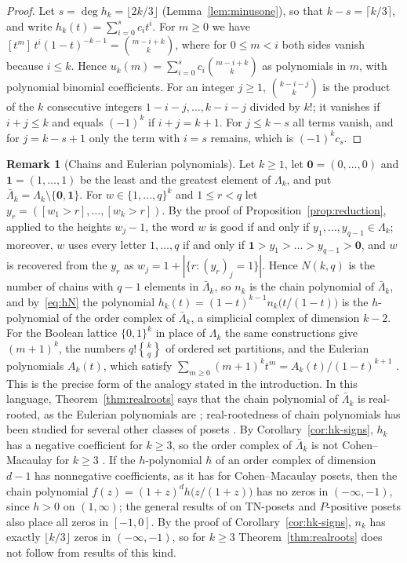 \documentclass[11pt]{amsart}
\theoremstyle{definition}
\newtheorem{remark}[theorem]{Remark}
\newcommand{\stirling}[2]{\genfrac{\{}{\}}{0pt}{}{#1}{#2}}
\begin{document}
\begin{proof}
Let $s=\deg h_k=\lfloor2k/3\rfloor$ (Lemma~\ref{lem:minusone}), so that $k-s=\lceil k/3\rceil$, and write $h_k(t)=\sum_{i=0}^{s}c_it^i$. For $m\ge0$ we have $[t^m]\,t^i(1-t)^{-k-1}=\binom{m-i+k}{k}$, where for $0\le m<i$ both sides vanish because $i\le k$. Hence $u_k(m)=\sum_{i=0}^{s}c_i\binom{m-i+k}{k}$ as polynomials in $m$, with polynomial binomial coefficients. For an integer $j\ge1$, $\binom{k-i-j}{k}$ is the product of the $k$ consecutive integers $1-i-j,\dots,k-i-j$ divided by $k!$; it vanishes if $i+j\le k$ and equals $(-1)^k$ if $i+j=k+1$. For $j\le k-s$ all terms vanish, and for $j=k-s+1$ only the term with $i=s$ remains, which is $(-1)^kc_s$.
\end{proof}

\begin{remark}[Chains and Eulerian polynomials]\label{rem:chains}
Let $k\ge1$, let $\mathbf 0=(0,\dots,0)$ and $\mathbf 1=(1,\dots,1)$ be the least and the greatest element of $\Lambda_k$, and put $\bar\Lambda_k=\Lambda_k\setminus\{\mathbf 0,\mathbf 1\}$. For $w\in\{1,\dots,q\}^k$ and $1\le r<q$ let $y_r=([w_1>r],\dots,[w_k>r])$. By the proof of Proposition~\ref{prop:reduction}, applied to the heights $w_j-1$, the word $w$ is good if and only if $y_1,\dots,y_{q-1}\in\Lambda_k$; moreover, $w$ uses every letter $1,\dots,q$ if and only if $\mathbf 1>y_1>\dots>y_{q-1}>\mathbf 0$, and $w$ is recovered from the $y_r$ as $w_j=1+|\{r:(y_r)_j=1\}|$. Hence $N(k,q)$ is the number of chains with $q-1$ elements in $\bar\Lambda_k$, so $n_k$ is the chain polynomial of $\bar\Lambda_k$, and by~\eqref{eq:hN} the polynomial $h_k(t)=(1-t)^{k-1}n_k\bigl(t/(1-t)\bigr)$ is the $h$-polynomial of the order complex of $\bar\Lambda_k$, a simplicial complex of dimension $k-2$. For the Boolean lattice $\{0,1\}^k$ in place of $\Lambda_k$ the same constructions give $(m+1)^k$, the numbers $q!\stirling{k}{q}$ of ordered set partitions, and the Eulerian polynomials $A_k(t)$, which satisfy $\sum_{m\ge0}(m+1)^kt^m=A_k(t)/(1-t)^{k+1}$ \cite[Section~1.4]{StanleyEC1}. This is the precise form of the analogy stated in the introduction. In this language, Theorem~\ref{thm:realroots} says that the chain polynomial of $\bar\Lambda_k$ is real-rooted, as the Eulerian polynomials are \cite{Branden}; real-rootedness of chain polynomials has been studied for several other classes of posets \cite{AK23,ADK24,BL26}. By Corollary~\ref{cor:hk-signs}, $h_k$ has a negative coefficient for $k\ge3$, so the order complex of $\bar\Lambda_k$ is not Cohen--Macaulay for $k\ge3$ \cite[Chapter~II]{StanleyCCA}. If the $h$-polynomial $h$ of an order complex of dimension $d-1$ has nonnegative coefficients, as it has for Cohen--Macaulay posets, then the chain polynomial $f(z)=(1+z)^dh\bigl(z/(1+z)\bigr)$ has no zeros in $(-\infty,-1)$, since $h>0$ on $(1,\infty)$; the general results of \cite{BL26} on TN-posets and $P$-positive posets also place all zeros in $[-1,0]$. By the proof of Corollary~\ref{cor:hk-signs}, $n_k$ has exactly $\lfloor k/3\rfloor$ zeros in $(-\infty,-1)$, so for $k\ge3$ Theorem~\ref{thm:realroots} does not follow from results of this kind.
\end{remark}
\end{document}
